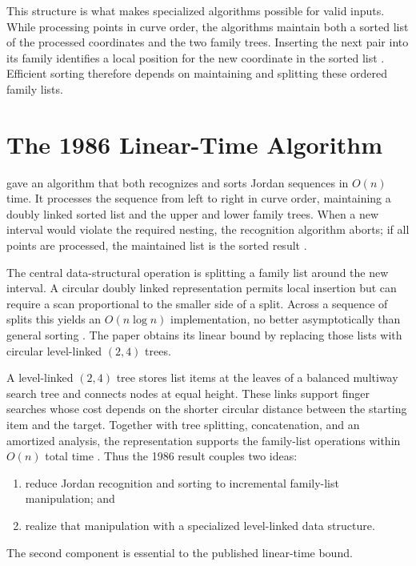 This structure is what makes specialized algorithms possible for valid
inputs. While processing points in curve order, the algorithms maintain both
a sorted list of the processed coordinates and the two family trees.
Inserting the next pair into its family identifies a local position for the
new coordinate in the sorted list
\parencite[pp.~173--175]{hoffmann1986sorting}. Efficient sorting therefore
depends on maintaining and splitting these ordered family lists.

\section{The 1986 Linear-Time Algorithm}
\label{sec:background-1986}

\textcite{hoffmann1986sorting} gave an algorithm that both recognizes and
sorts Jordan sequences in $O(n)$ time. It processes the sequence from left to
right in curve order, maintaining a doubly linked sorted list and the upper
and lower family trees. When a new interval would violate the required
nesting, the recognition algorithm aborts; if all points are processed, the
maintained list is the sorted result \parencite[pp.~173--175]{hoffmann1986sorting}.

The central data-structural operation is splitting a family list around the
new interval. A circular doubly linked representation permits local insertion
but can require a scan proportional to the smaller side of a split. Across a
sequence of splits this yields an $O(n\log n)$ implementation, no better
asymptotically than general sorting \parencite[pp.~175--176]{hoffmann1986sorting}.
The paper obtains its linear bound by replacing those lists with circular
level-linked $(2,4)$ trees.

A level-linked $(2,4)$ tree stores list items at the leaves of a balanced
multiway search tree and connects nodes at equal height. These links support
finger searches whose cost depends on the shorter circular distance between
the starting item and the target. Together with tree splitting,
concatenation, and an amortized analysis, the representation supports the
family-list operations within $O(n)$ total time
\parencite[pp.~177--183]{hoffmann1986sorting}. Thus the 1986 result couples
two ideas:
\begin{enumerate}
  \item reduce Jordan recognition and sorting to incremental family-list
    manipulation; and
  \item realize that manipulation with a specialized level-linked data
    structure.
\end{enumerate}
The second component is essential to the published linear-time bound.

